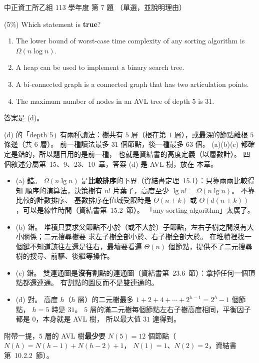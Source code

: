 \begin{pastexam}[label={px:ccu-113-csb-03}]{中正資工所乙組 113 學年度 第 7 題}
（單選，並說明理由）

(5\%) Which statement is \textbf{true}?
\begin{enumerate}[label=(\alph*),itemsep=0pt]
\item The lower bound of worst-case time complexity of any sorting algorithm is $\Omega(n\log n)$.
\item A heap can be used to implement a binary search tree.
\item A bi-connected graph is a connected graph that has two articulation points.
\item The maximum number of nodes in an AVL tree of depth 5 is 31.
\end{enumerate}
\end{pastexam}

\begin{pastsoln}
答案是 (d)。

(d) 的「depth 5」有兩種讀法：樹共有 $5$ 層（根在第 $1$ 層），或最深的節點離根 $5$ 條邊（共 $6$ 層）。
前一種讀法最多 $31$ 個節點，後一種最多 $63$ 個。 (a)(b)(c) 都確定是錯的，所以題目用的是前一種，
也就是資結書的高度定義（以層數計）。 四個敘述分屬第~15、9、23、10~章，答案 (d) 是 AVL 樹，放在
本章。
\begin{itemize}
\item (a) 錯。 $\Omega(n \lg n)$ 是\textbf{比較排序}的下界（資結書定理~15.1）：只靠兩兩比較得知
順序的演算法，決策樹有 $n!$ 片葉子，高度至少 $\lg n! = \Omega(n \lg n)$。 不靠比較的計數排序、
基數排序在值域受限時是 $\Theta(n + k)$ 或 $\Theta(d(n + k))$，可以是線性時間（資結書第~15.2~節）。
「any sorting algorithm」太廣了。
\item (b) 錯。 堆積只要求父節點不小於（或不大於）子節點，左右子樹之間沒有大小關係；二元搜尋樹要
求左子樹全部小於、右子樹全部大於。 在堆積裡找一個鍵不知道該往左還是往右，最壞要看遍 $\Theta(n)$
個節點，提供不了二元搜尋樹的搜尋、前驅、後繼等操作。
\item (c) 錯。 雙連通圖是\textbf{沒有}割點的連通圖（資結書第~23.6~節）：拿掉任何一個頂點都還連通。
有割點的圖反而不是雙連通的。
\item (d) 對。 高度 $h$（$h$ 層）的二元樹最多 $1 + 2 + 4 + \cdots + 2^{h-1} = 2^h - 1$ 個節點，
$h = 5$ 時是 $31$。 $5$ 層的滿二元樹每個節點左右子樹高度相同，平衡因子都是 $0$，本身就是 AVL 樹，
所以最大值 $31$ 達得到。
\end{itemize}
附帶一提，$5$ 層的 AVL 樹\textbf{最少}要 $N(5) = 12$ 個節點（$N(h) = N(h-1) + N(h-2) + 1$，
$N(1) = 1$、$N(2) = 2$，資結書第~10.2.2~節）。
\end{pastsoln}
